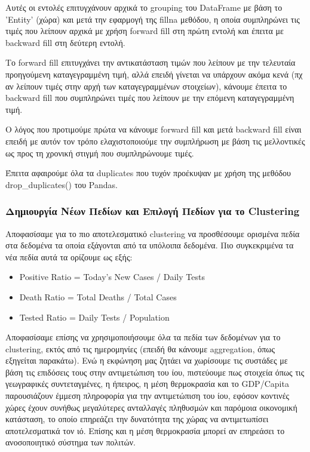 \documentclass[12pt,a4paper]{article}
\begin{document}
Αυτές οι εντολές επιτυγχάνουν αρχικά το grouping του DataFrame με βάση το 'Entity' (χώρα) και μετά την εφαρμογή της fillna μεθόδου, η οποία συμπληρώνει τις τιμές που λείπουν αρχικά με χρήση forward fill στη πρώτη εντολή και έπειτα με backward fill στη δεύτερη εντολή.

Το forward fill επιτυγχάνει την αντικατάσταση τιμών που λείπουν με την τελευταία προηγούμενη καταγεγραμμένη τιμή, αλλά επειδή γίνεται να υπάρχουν ακόμα κενά (πχ αν λείπουν τιμές στην αρχή των καταγεγραμμένων στοιχείων), κάνουμε έπειτα το backward fill που συμπληρώνει τιμές που λείπουν με την επόμενη καταγεγραμμένη τιμή.

Ο λόγος που προτιμούμε πρώτα να κάνουμε forward fill και μετά backward fill είναι επειδή με αυτόν τον τρόπο ελαχιστοποιούμε την συμπλήρωση με βάση τις μελλοντικές ως προς τη χρονική στιγμή που συμπληρώνουμε τιμές.

Έπειτα αφαιρούμε όλα τα duplicates που τυχόν προέκυψαν με χρήση της μεθόδου drop\_duplicates() του Pandas.

\subsubsection{Δημιουργία Νέων Πεδίων και Επιλογή Πεδίων για το Clustering}

Αποφασίσαμε για το πιο αποτελεσματικό clustering να προσθέσουμε ορισμένα πεδία στα δεδομένα τα οποία εξάγονται από τα υπόλοιπα δεδομένα. Πιο συγκεκριμένα τα νέα πεδία αυτά τα ορίζουμε ως εξής:

\begin{itemize}
    \item Positive Ratio = Today's New Cases / Daily Tests
    \item Death Ratio = Total Deaths / Total Cases
    \item Tested Ratio = Daily Tests / Population
\end{itemize}

Αποφασίσαμε επίσης να χρησιμοποιήσουμε όλα τα πεδία των δεδομένων για το clustering, εκτός από τις ημερομηνίες (επειδή θα κάνουμε aggregation, όπως εξηγείται παρακάτω). Ενώ η εκφώνηση μας ζητάει να χωρίσουμε τις συστάδες με βάση τις επιδόσεις τους στην αντιμετώπιση του ίου, πιστεύουμε πως στοιχεία όπως τις γεωγραφικές συντεταγμένες, η ήπειρος, η μέση θερμοκρασία και το GDP/Capita παρουσιάζουν έμμεση πληροφορία για την αντιμετώπιση του ίου, εφόσον κοντινές χώρες έχουν συνήθως μεγαλύτερες ανταλλαγές πληθυσμών και παρόμοια οικονομική κατάσταση, το οποίο επηρεάζει την δυνατότητα της χώρας να αντιμετωπίσει αποτελεσματικά τον ιό. Επίσης και η μέση θερμοκρασία μπορεί αν επηρεάσει το ανοσοποιητικό σύστημα των πολιτών.
\end{document}

